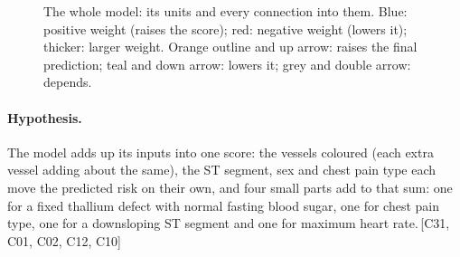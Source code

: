 \documentclass[a4paper,10pt]{article}
\newif\ifreviewmarks
\newcommand{\reviewrule}{\noindent{\color{BrickRed}\rule{\linewidth}{0.8pt}}}
\newenvironment{drafted}[1][]{%
  \ifreviewmarks\par\addvspace{\medskipamount}\reviewrule\par\nopagebreak
  \noindent{\color{BrickRed}\sffamily\footnotesize\textbf{Thesis Draft}\quad #1\hfill review}\par\nopagebreak\smallskip\fi}{%
  \ifreviewmarks\par\smallskip\noindent{\color{BrickRed}\sffamily\footnotesize end of thesis draft}\par\nopagebreak\reviewrule\par\medskip\fi}
\begin{document}
\begin{drafted}[plain-language layer: heart-s4-c1]
\begin{figure}[H]
{}%
\caption{The whole model: its units and every connection into them. Blue: positive weight (raises the score); red: negative weight (lowers it); thicker: larger weight. Orange outline and up arrow: raises the final prediction; teal and down arrow: lowers it; grey and double arrow: depends.}
\label{fig:hearts4c1:units-ann35}
\end{figure}
\paragraph{Hypothesis.} The model adds up its inputs into one score: the vessels coloured (each extra vessel adding about the same), the ST segment, sex and chest pain type each move the predicted risk on their own, and four small parts add to that sum: one for a fixed thallium defect with normal fasting blood sugar, one for chest pain type, one for a downsloping ST segment and one for maximum heart rate.\,{\scriptsize\textcolor{NavyBlue}{[C31, C01, C02, C12, C10]}}

\end{drafted}
\end{document}
